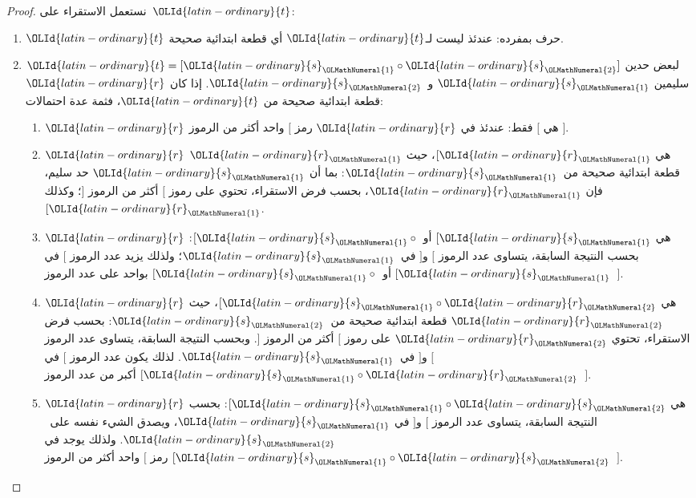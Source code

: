 \documentclass[../../../include/open-logic-section]{subfiles}
\begin{document}
\begin{proof}
  نستعمل الاستقراء على~${\OLId{latin-ordinary}{t}}$:
  \begin{enumerate}
  \item ${\OLId{latin-ordinary}{t}}$ حرف بمفرده: عندئذ ليست لـ${\OLId{latin-ordinary}{t}}$ أي قطعة ابتدائية صحيحة.
  \item ${\OLId{latin-ordinary}{t}} = [{\OLId{latin-ordinary}{s}}_{\OLMathNumeral{1}} \circ {\OLId{latin-ordinary}{s}}_{\OLMathNumeral{2}}]$ لبعض حدين سليمين ${\OLId{latin-ordinary}{s}}_{\OLMathNumeral{1}}$ و~${\OLId{latin-ordinary}{s}}_{\OLMathNumeral{2}}$. إذا
    كان ${\OLId{latin-ordinary}{r}}$ قطعة ابتدائية صحيحة من ${\OLId{latin-ordinary}{t}}$، فثمة عدة احتمالات:
    \begin{enumerate}
    \item ${\OLId{latin-ordinary}{r}}$ هي $[$ فقط: عندئذ في ${\OLId{latin-ordinary}{r}}$ رمز $[$ واحد أكثر من الرموز
      $]$.
    \item ${\OLId{latin-ordinary}{r}}$ هي $[{\OLId{latin-ordinary}{r}}_{\OLMathNumeral{1}}$، حيث ${\OLId{latin-ordinary}{r}}_{\OLMathNumeral{1}}$ قطعة ابتدائية صحيحة من~${\OLId{latin-ordinary}{s}}_{\OLMathNumeral{1}}$:
      بما أن ${\OLId{latin-ordinary}{s}}_{\OLMathNumeral{1}}$ حد سليم، فإن ${\OLId{latin-ordinary}{r}}_{\OLMathNumeral{1}}$، بحسب فرض الاستقراء، تحتوي على
      رموز $[$ أكثر من الرموز $]$؛ وكذلك $[{\OLId{latin-ordinary}{r}}_{\OLMathNumeral{1}}$.
    \item ${\OLId{latin-ordinary}{r}}$ هي $[{\OLId{latin-ordinary}{s}}_{\OLMathNumeral{1}}$ أو $[{\OLId{latin-ordinary}{s}}_{\OLMathNumeral{1}} \circ {}$: بحسب النتيجة السابقة،
      يتساوى عدد الرموز $[$ و$]$ في~${\OLId{latin-ordinary}{s}}_{\OLMathNumeral{1}}$؛ ولذلك يزيد عدد الرموز $[$
      في $[{\OLId{latin-ordinary}{s}}_{\OLMathNumeral{1}}$ أو $[{\OLId{latin-ordinary}{s}}_{\OLMathNumeral{1}} \circ {}$ بواحد على عدد الرموز~$]$.
    \item ${\OLId{latin-ordinary}{r}}$ هي $[{\OLId{latin-ordinary}{s}}_{\OLMathNumeral{1}} \circ {\OLId{latin-ordinary}{r}}_{\OLMathNumeral{2}}$، حيث ${\OLId{latin-ordinary}{r}}_{\OLMathNumeral{2}}$ قطعة ابتدائية صحيحة
      من~${\OLId{latin-ordinary}{s}}_{\OLMathNumeral{2}}$: بحسب فرض الاستقراء، تحتوي ${\OLId{latin-ordinary}{r}}_{\OLMathNumeral{2}}$ على رموز $[$ أكثر من
      الرموز $]$. وبحسب النتيجة السابقة، يتساوى عدد الرموز $[$ و$]$
      في~${\OLId{latin-ordinary}{s}}_{\OLMathNumeral{1}}$. لذلك يكون عدد الرموز $[$ في $[{\OLId{latin-ordinary}{s}}_{\OLMathNumeral{1}} \circ {\OLId{latin-ordinary}{r}}_{\OLMathNumeral{2}}$ أكبر من
      عدد الرموز~$]$.
    \item ${\OLId{latin-ordinary}{r}}$ هي $[{\OLId{latin-ordinary}{s}}_{\OLMathNumeral{1}} \circ {\OLId{latin-ordinary}{s}}_{\OLMathNumeral{2}}$: بحسب النتيجة السابقة، يتساوى عدد
      الرموز $[$ و$]$ في ${\OLId{latin-ordinary}{s}}_{\OLMathNumeral{1}}$، ويصدق الشيء نفسه على~${\OLId{latin-ordinary}{s}}_{\OLMathNumeral{2}}$. ولذلك
      يوجد في $[{\OLId{latin-ordinary}{s}}_{\OLMathNumeral{1}} \circ {\OLId{latin-ordinary}{s}}_{\OLMathNumeral{2}}$ رمز $[$ واحد أكثر من الرموز~$]$.
    \end{enumerate}
  \end{enumerate}
\end{proof}
\end{document}
